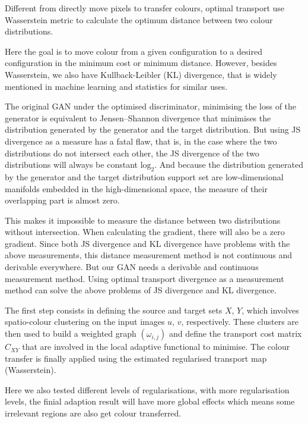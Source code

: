 \documentclass{article}
\begin{document}
Different from directly move pixels to transfer colours, optimal transport use Wasserstein metric to calculate the optimum distance between two colour distributions.

Here the goal is to move colour from a given configuration to a desired configuration in the minimum cost or minimum distance. However, besides Wasserstein, we also have Kullback-Leibler (KL) divergence, that is widely mentioned in machine learning and statistics for similar uses.

The original GAN under the optimised discriminator, minimising the loss of the generator is equivalent to Jensen–Shannon divergence that minimises the distribution generated by the generator and the target distribution. But using JS divergence as a measure has a fatal flaw, that is, in the case where the two distributions do not intersect each other, the JS divergence of the two distributions will always be constant $\mathrm{log}_2$. And because the distribution generated by the generator and the target distribution support set are low-dimensional manifolds embedded in the high-dimensional space, the measure of their overlapping part is almost zero.

This makes it impossible to measure the distance between two distributions without intersection. When calculating the gradient, there will also be a zero gradient. Since both JS divergence and KL divergence have problems with the above measurements, this distance measurement method is not continuous and derivable everywhere. But our GAN needs a derivable and continuous measurement method. Using optimal transport divergence as a measurement method can solve the above problems of JS divergence and KL divergence.

The first step consists in defining the source and target sets $X$, $Y$, which involves spatio-colour clustering on the input images $u$, $v$, respectively. These clusters are then used to build a weighted graph $\left(\omega_{i, j}\right)$ and define the transport cost matrix $C_{XY}$ that are involved in the local adaptive functional to minimise. The colour transfer is finally applied using the estimated regularised transport map (Wasserstein).

Here we also tested different levels of regularisations, with more regularisation levels, the finial adaption result will have more global effects which means some irrelevant regions are also get colour transferred.
\end{document}
